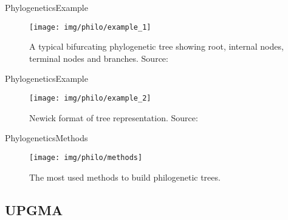 \documentclass[10pt]{beamer}
\newcommand{\1}{
	\setbeamertemplate{background}{
		\texttt{[image: img/1]}
		\tikz[overlay] \fill[fill opacity=0.75,fill=white] (0,0) rectangle (-\paperwidth,\paperheight);
	}
}
\begin{document}
\begin{frame}{Phylogenetics}{Example}
	\begin{figure}
		\texttt{[image: img/philo/example\_1]}
		\caption{A typical bifurcating phylogenetic tree showing root, internal nodes, terminal nodes and branches. Source: \cite{xiong2006essential}}			
	\end{figure}
\end{frame}

\begin{frame}{Phylogenetics}{Example}
	\begin{figure}
		\texttt{[image: img/philo/example\_2]}
		\caption{Newick format of tree representation. Source: \cite{xiong2006essential}}			
	\end{figure}
\end{frame}

\begin{frame}{Phylogenetics}{Methods}
	\begin{figure}
		\texttt{[image: img/philo/methods]}
		\caption{The most used methods to build philogenetic trees.}			
	\end{figure}
\end{frame}

\subsection{UPGMA}
\end{document}
